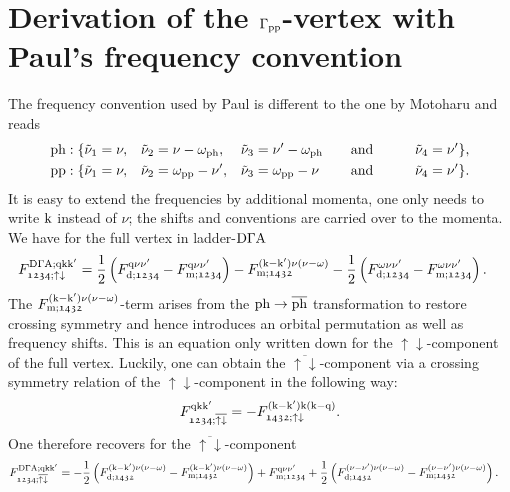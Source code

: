 \documentclass[main.tex]{subfiles}
\begin{document}
\newpage

\section{Derivation of the $\Gamma_{\text{pp}}$-vertex with Paul's frequency convention}

The frequency convention used by Paul is different to the one by Motoharu and reads
\begin{subequations}
\begin{align}
	&\text{ph}: \{\tilde\nu_1=\nu,&&\tilde\nu_2=\nu-\omega_{\text{ph}},&&\tilde\nu_3=\nu'-\omega_{\text{ph}}\qquad\text{and}\qquad&&\tilde\nu_4=\nu' \}, \\
	&\text{pp}: \{\tilde\nu_1=\nu,&&\tilde\nu_2=\omega_{\text{pp}}-\nu',&&\tilde\nu_3=\omega_{\text{pp}}-\nu\phantom{'}\qquad\text{and}\qquad&&\tilde\nu_4=\nu' \}.
\end{align}
\end{subequations}
It is easy to extend the frequencies by additional momenta, one only needs to write $\text{k}$ instead of $\nu$; the shifts and conventions are carried over to the momenta. We have for the full vertex in ladder-$\text{D}\Gamma\text{A}$ \cite{anna galler thesis, rohringer thesis}
\begin{align}
	F^{\text{D}\Gamma\text{A};\text{q}\text{k}\text{k}'}_{\mathfrak{1234};\uparrow\downarrow}&=\frac12\left (F_{\text{d};\mathfrak{1234}}^{\text{q}\nu\nu'}-F_{\text{m};\mathfrak{1234}}^{\text{q}\nu\nu'}\right )-F_{\text{m};\mathfrak{1432}}^{(\text{k}-\text{k}')\nu(\nu-\omega)}-\frac12\left (F_{\text{d};\mathfrak{1234}}^{\omega\nu\nu'}-F_{\text{m};\mathfrak{1234}}^{\omega\nu\nu'}\right ).
\end{align}
The $F_{\text{m};\mathfrak{1432}}^{(\text{k}-\text{k}')\nu(\nu-\omega)}$-term arises from the $\text{ph}\to\overline{\text{ph}}$ transformation to restore crossing symmetry and hence introduces an orbital permutation as well as frequency shifts. This is an equation only written down for the $\uparrow\downarrow$-component of the full vertex. Luckily, one can obtain the $\overline{\uparrow\downarrow}$-component via a crossing symmetry relation of the $\uparrow\downarrow$-component in the following way:
\begin{align}
	F^{\text{q}\text{k}\text{k}'}_{\mathfrak{1234};\overline{\uparrow\downarrow}}=-F^{(\text{k}-\text{k}')\text{k}(\text{k}-\text{q})}_{\mathfrak{1432};\uparrow\downarrow}.
\end{align}
One therefore recovers for the $\overline{\uparrow\downarrow}$-component
\begin{align}
	F^{\text{D}\Gamma\text{A};\text{q}\text{k}\text{k}'}_{\mathfrak{1234};\overline{\uparrow\downarrow}}&=-\frac12\left (F_{\text{d};\mathfrak{1432}}^{(\text{k}-\text{k}')\nu(\nu-\omega)}-F_{\text{m};\mathfrak{1432}}^{(\text{k}-\text{k}')\nu(\nu-\omega)}\right )+F_{\text{m};\mathfrak{1234}}^{\text{q}\nu\nu'}+\frac12\left (F_{\text{d};\mathfrak{1432}}^{(\nu-\nu')\nu(\nu-\omega)}-F_{\text{m};\mathfrak{1432}}^{(\nu-\nu')\nu(\nu-\omega)}\right ).
\end{align}
\end{document}
